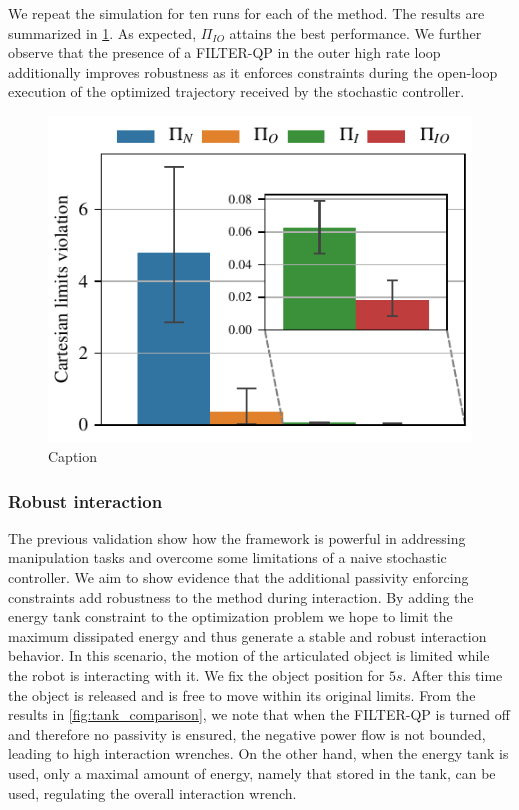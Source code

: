 We repeat the simulation for ten runs for each of the method. The results are summarized in \fig \ref{fig:obstacle_avoidance}. As expected, $\Pi_{IO}$ attains the best performance. We further observe that the presence of a FILTER-QP in the outer high rate loop additionally improves robustness as it enforces constraints during the open-loop execution of the optimized trajectory received by the stochastic controller. 
\begin{figure}[t]
    \centering
    \includegraphics[width=0.7\columnwidth]{figures/obstacle_avoidance/obstacle_avoidance_test.pdf}
    \caption{Caption}
    \label{fig:obstacle_avoidance}
\end{figure}

\vspace{0.5cm}
\subsubsection{Robust interaction}
The previous validation show how the framework is powerful in addressing manipulation tasks and overcome some limitations of a naive stochastic controller. We aim to show evidence that the additional passivity enforcing constraints add robustness to the method during interaction. By adding the energy tank constraint to the optimization problem we hope to limit the maximum dissipated energy and thus generate a stable and robust interaction behavior. In this scenario, the motion of the articulated object is limited while the robot is interacting with it. We fix the object position for $5s$. After this time the object is released and is free to move within its original limits. From the results in \fig\ref{fig:tank_comparison}, we note that when the FILTER-QP is turned off and therefore no passivity is ensured, the negative power flow is not bounded, leading to high interaction wrenches. On the other hand, when the energy tank is used, only a maximal amount of energy, namely that stored in the tank, can be used, regulating the overall interaction wrench.

